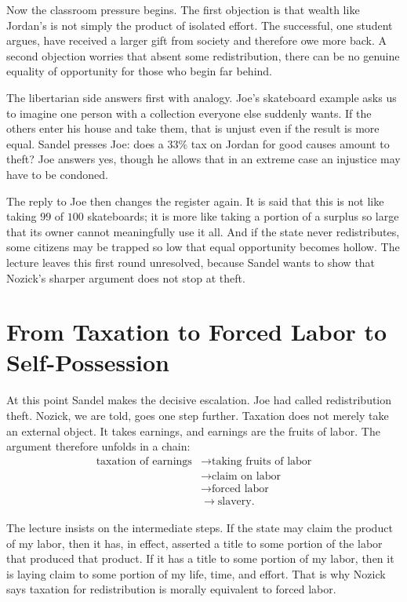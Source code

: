 Now the classroom pressure begins. The first objection is that wealth like Jordan's is not simply the product of isolated effort. The successful, one student argues, have received a larger gift from society and therefore owe more back. A second objection worries that absent some redistribution, there can be no genuine equality of opportunity for those who begin far behind.

The libertarian side answers first with analogy. Joe's skateboard example asks us to imagine one person with a collection everyone else suddenly wants. If the others enter his house and take them, that is unjust even if the result is more equal. Sandel presses Joe: does a \(33\%\) tax on Jordan for good causes amount to theft? Joe answers yes, though he allows that in an extreme case an injustice may have to be condoned.

The reply to Joe then changes the register again. It is said that this is not like taking \(99\) of \(100\) skateboards; it is more like taking a portion of a surplus so large that its owner cannot meaningfully use it all. And if the state never redistributes, some citizens may be trapped so low that equal opportunity becomes hollow. The lecture leaves this first round unresolved, because Sandel wants to show that Nozick's sharper argument does not stop at theft.

\section{From Taxation to Forced Labor to Self-Possession}

At this point Sandel makes the decisive escalation. Joe had called redistribution theft. Nozick, we are told, goes one step further. Taxation does not merely take an external object. It takes earnings, and earnings are the fruits of labor. The argument therefore unfolds in a chain:
\begin{align}
\text{taxation of earnings}
&\to \text{taking fruits of labor} \\
&\to \text{claim on labor} \\
&\to \text{forced labor} \\
&\to \text{slavery}.
\end{align}

The lecture insists on the intermediate steps. If the state may claim the product of my labor, then it has, in effect, asserted a title to some portion of the labor that produced that product. If it has a title to some portion of my labor, then it is laying claim to some portion of my life, time, and effort. That is why Nozick says taxation for redistribution is morally equivalent to forced labor.

